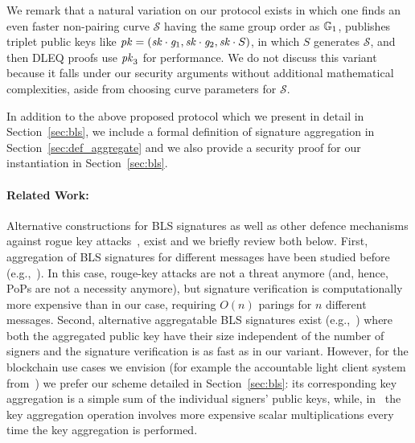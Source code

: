 We remark that a natural variation on our protocol exists in which
one finds an even faster non-pairing curve $\mathcal{S}$ having the same
group order as $\mathbb{G}_{1}$,  publishes triplet public keys like
$\mathit{pk} = (\mathit{sk} \cdot \mathit{g}_{1}, \mathit{sk} \cdot \mathit{g}_{2}, \mathit{sk} \cdot S)$, in which $S$ generates
$\mathcal{S}$, and then DLEQ proofs use $\mathit{pk}_3$ for performance.
We do not discuss this variant because it falls under our security
arguments without additional mathematical complexities,
aside from choosing curve parameters for $\mathcal{S}$.


In addition to the above proposed protocol which we present in detail in Section~\ref{sec:bls}, 
we include a formal definition of signature aggregation in Section~\ref{sec:def_aggregate} and we also 
provide a security proof for our instantiation in Section~\ref{sec:bls}.\\ 
 
\paragraph{Related Work:} Alternative constructions for BLS signatures as well as other defence mechanisms against 
rogue key attacks~\cite{proofs_of_posession}, exist and we briefly review both below. First, aggregation of BLS signatures for different messages have been studied before
(e.g.,~\cite{aggregate_BLS_signatures}). In this case, rouge-key attacks are not a threat anymore (and, hence, PoPs are not a necessity anymore), 
but signature verification is computationally more expensive than in our case, requiring $O(n)$ parings for $n$ different messages. Second, alternative aggregatable 
BLS signatures exist (e.g.,~\cite{boneh_compact_multisig}) where both the aggregated public key have their size independent 
of the number of signers and the signature verification is as fast as in our variant. However, for the blockchain use cases we envision 
(for example the accountable light client system from~\cite{ourLC}) we prefer our scheme detailed in Section~\ref{sec:bls}: its corresponding key aggregation is a simple sum 
of the individual signers' public keys, while, in~\cite{boneh_compact_multisig} the key aggregation operation involves more expensive scalar 
multiplications every time the key aggregation is performed.
